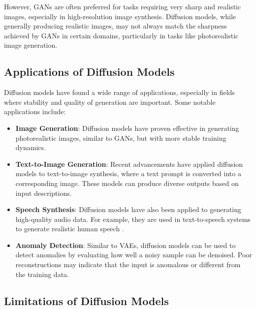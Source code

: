 However, GANs are often preferred for tasks requiring very sharp and realistic images, especially in high-resolution image synthesis. Diffusion models, while generally producing realistic images, may not always match the sharpness achieved by GANs in certain domains, particularly in tasks like photorealistic image generation.

\subsection{Applications of Diffusion Models}

Diffusion models have found a wide range of applications, especially in fields where stability and quality of generation are important. Some notable applications include:
\begin{itemize}
    \item \textbf{Image Generation}: Diffusion models have proven effective in generating photorealistic images, similar to GANs, but with more stable training dynamics.
    \item \textbf{Text-to-Image Generation}: Recent advancements have applied diffusion models to text-to-image synthesis, where a text prompt is converted into a corresponding image. These models can produce diverse outputs based on input descriptions.
    \item \textbf{Speech Synthesis}: Diffusion models have also been applied to generating high-quality audio data. For example, they are used in text-to-speech systems to generate realistic human speech \citep{chen2020wavegrad}.
    \item \textbf{Anomaly Detection}: Similar to VAEs, diffusion models can be used to detect anomalies by evaluating how well a noisy sample can be denoised. Poor reconstructions may indicate that the input is anomalous or different from the training data.
\end{itemize}

\subsection{Limitations of Diffusion Models}

